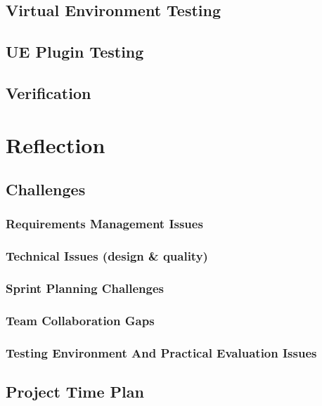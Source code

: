 \documentclass[12pt,a4paper]{report}
\begin{document}
\section{Virtual Environment Testing}

\section{UE Plugin Testing}

\section{Verification}


\chapter{Reflection}

\section{Challenges}

\subsection{Requirements Management Issues}

\subsection{Technical Issues (design \& quality)}

\subsection{Sprint Planning Challenges}

\subsection{Team Collaboration Gaps}

\subsection{Testing Environment And Practical Evaluation Issues}

\section{Project Time Plan}
\end{document}
